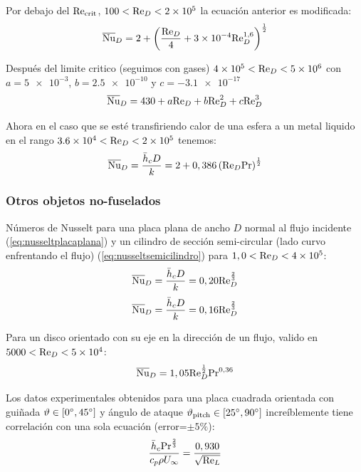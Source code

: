 Por debajo del $\textrm{Re}_{\mathrm{crit}}$,  $100<\textrm{Re}_D<\num{2e5}$ la ecuación anterior es modificada:
\begin{equation}\label{eq:nusseltspheresubcrit}
    \overline{\textrm{Nu}}_D=2+\left( \frac{\textrm{Re}_D}{4}+\num{3e-4}\textrm{Re}_D^{1,6}\right)^\frac{1}{2}
\end{equation}

Después del limite critico (seguimos con gases) $\num{4e5}<\textrm{Re}_D<\num{5e6}$ con $a=\num{5e-3}$, $b=\num{2,5e-10}$ y $c=\num{-3,1e-17}$
\begin{equation}
    \overline{\textrm{Nu}}_D=430+a\textrm{Re}_D+b\textrm{Re}_D^2+c\textrm{Re}_D^3
\end{equation}

Ahora en el caso que se esté transfiriendo calor de una esfera a un metal liquido en el rango $\num{3.6e4}<\textrm{Re}_D<\num{2e5}$ tenemos:
\begin{equation}
    \overline{\textrm{Nu}}_D=\frac{\bar{h}_c D}{k}=2+0,386 \left( \textrm{Re}_D \textrm{Pr}\right)^{\frac{1}{2}}
\end{equation}

\subsubsection{Otros objetos no-fuselados}
Números de Nusselt para una placa plana de ancho $D$ normal al flujo incidente (\ref{eq:nusseltplacaplana}) y un cilindro de sección semi-circular (lado curvo enfrentando el flujo) (\ref{eq:nusseltsemicilindro}) para $1,0<\textrm{Re}_D<\num{4e5}$:
\begin{equation}\label{eq:nusseltplacaplana}
    \overline{\textrm{Nu}}_D=\frac{\bar{h}_c D}{k}=0,20\textrm{Re}^{\frac{2}{3}}_D
\end{equation}
\begin{equation}\label{eq:nusseltsemicilindro}
    \overline{\textrm{Nu}}_D=\frac{\bar{h}_c D}{k}=0,16\textrm{Re}^{\frac{2}{3}}_D
\end{equation}

Para un disco orientado con su eje en la dirección de un flujo, valido en $5000<\textrm{Re}_D<\num{5e4}$:
\begin{equation}
    \overline{\textrm{Nu}}_D=1,05\textrm{Re}_D^{\frac{1}{2}} \textrm{Pr}^{0,36}
\end{equation}

Los datos experimentales obtenidos para una placa cuadrada orientada con guiñada $\vartheta\in [0^{\circ},45^{\circ}]$ y ángulo de ataque $\vartheta_{\textrm{pitch}}\in[25^{\circ},90^{\circ}]$ increíblemente tiene correlación con una sola ecuación (error=$\pm 5\%$):
\begin{equation}
    \frac{\bar{h}_c \textrm{Pr}^{\frac{2}{3}}}{c_p\rho U_\infty}=\frac{0,930}{\sqrt{\textrm{Re}_L}}
\end{equation}
